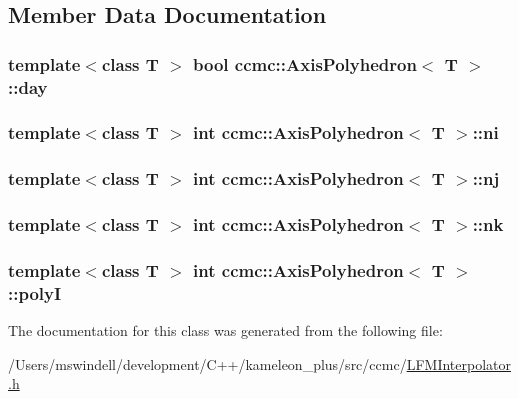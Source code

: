 \subsection{Member Data Documentation}
\hypertarget{classccmc_1_1_axis_polyhedron_a1f981cc1441ff15a0e5a80f666b3bcbb}{
\subsubsection[{day}]{\setlength{\rightskip}{0pt plus 5cm}template$<$class T $>$ bool {\bf ccmc\-::\-Axis\-Polyhedron}$<$ T $>$\-::day}}\label{classccmc_1_1_axis_polyhedron_a1f981cc1441ff15a0e5a80f666b3bcbb}
\hypertarget{classccmc_1_1_axis_polyhedron_ac3160e03e3b37a3ca3eb2022662f7bd2}{
\subsubsection[{ni}]{\setlength{\rightskip}{0pt plus 5cm}template$<$class T $>$ int {\bf ccmc\-::\-Axis\-Polyhedron}$<$ T $>$\-::ni}}\label{classccmc_1_1_axis_polyhedron_ac3160e03e3b37a3ca3eb2022662f7bd2}
\hypertarget{classccmc_1_1_axis_polyhedron_a62de873c6e6bd244a75fe64a2538f501}{
\subsubsection[{nj}]{\setlength{\rightskip}{0pt plus 5cm}template$<$class T $>$ int {\bf ccmc\-::\-Axis\-Polyhedron}$<$ T $>$\-::nj}}\label{classccmc_1_1_axis_polyhedron_a62de873c6e6bd244a75fe64a2538f501}
\hypertarget{classccmc_1_1_axis_polyhedron_a9fb6852015288390760e0e231daef379}{
\subsubsection[{nk}]{\setlength{\rightskip}{0pt plus 5cm}template$<$class T $>$ int {\bf ccmc\-::\-Axis\-Polyhedron}$<$ T $>$\-::nk}}\label{classccmc_1_1_axis_polyhedron_a9fb6852015288390760e0e231daef379}
\hypertarget{classccmc_1_1_axis_polyhedron_a86bf3b4fab1d62d902ecbc97b1ff2b7f}{
\subsubsection[{poly\-I}]{\setlength{\rightskip}{0pt plus 5cm}template$<$class T $>$ int {\bf ccmc\-::\-Axis\-Polyhedron}$<$ T $>$\-::poly\-I}}\label{classccmc_1_1_axis_polyhedron_a86bf3b4fab1d62d902ecbc97b1ff2b7f}


The documentation for this class was generated from the following file\-:\begin{DoxyCompactItemize}
\item 
/\-Users/mswindell/development/\-C++/kameleon\-\_\-plus/src/ccmc/\hyperlink{_l_f_m_interpolator_8h}{L\-F\-M\-Interpolator.\-h}\end{DoxyCompactItemize}
